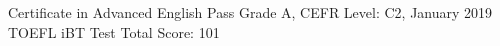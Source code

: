 \twocolumnsection
    {
        \begin{skills}
        \end{skills}
    }
    {
            \begin{keywords}
        \keywordsentry
{Certificate in Advanced English}
{Pass Grade A, CEFR Level: C2, January 2019}
        \keywordsentry
{TOEFL iBT Test}
{Total Score: 101}
            \end{keywords}
    }
